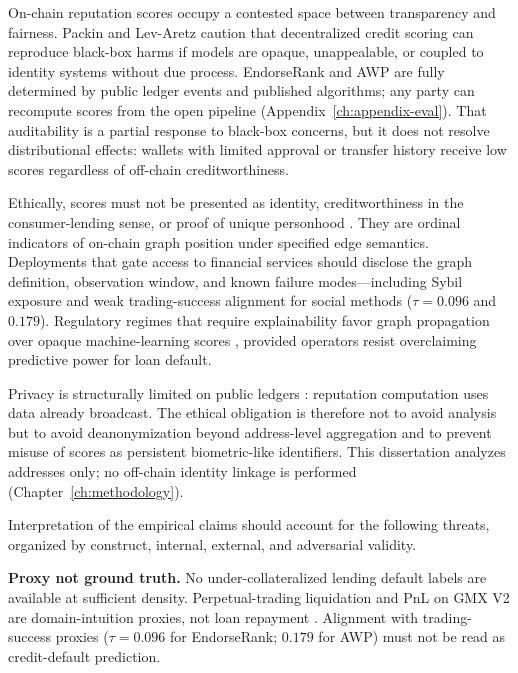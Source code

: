 
On-chain reputation scores occupy a contested space between transparency and fairness. Packin and Lev-Aretz caution that decentralized credit scoring can reproduce black-box harms if models are opaque, unappealable, or coupled to identity systems without due process. EndorseRank and AWP are fully determined by public ledger events and published algorithms; any party can recompute scores from the open pipeline (Appendix~\ref{ch:appendix-eval}). That auditability is a partial response to black-box concerns, but it does not resolve distributional effects: wallets with limited approval or transfer history receive low scores regardless of off-chain creditworthiness.

Ethically, scores must not be presented as identity, creditworthiness in the consumer-lending sense, or proof of unique personhood . They are ordinal indicators of on-chain graph position under specified edge semantics. Deployments that gate access to financial services should disclose the graph definition, observation window, and known failure modes---including Sybil exposure and weak trading-success alignment for social methods ($\tau=0.096$ and $0.179$). Regulatory regimes that require explainability favor graph propagation over opaque machine-learning scores , provided operators resist overclaiming predictive power for loan default.

Privacy is structurally limited on public ledgers : reputation computation uses data already broadcast. The ethical obligation is therefore not to avoid analysis but to avoid deanonymization beyond address-level aggregation and to prevent misuse of scores as persistent biometric-like identifiers. This dissertation analyzes addresses only; no off-chain identity linkage is performed (Chapter~\ref{ch:methodology}).


Interpretation of the empirical claims should account for the following threats, organized by construct, internal, external, and adversarial validity.


\textbf{Proxy not ground truth.} No under-collateralized lending default labels are available at sufficient density. Perpetual-trading liquidation and PnL on GMX V2 are domain-intuition proxies, not loan repayment . Alignment with trading-success proxies ($\tau=0.096$ for EndorseRank; $0.179$ for AWP) must not be read as credit-default prediction.

